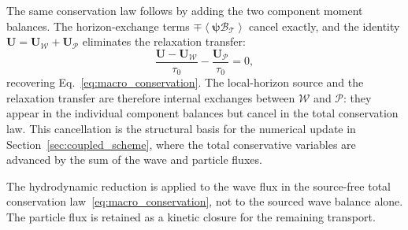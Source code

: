 \documentclass[preprint,12pt]{elsarticle}
\begin{document}
The same conservation law follows by adding the two component moment balances. The horizon-exchange terms $\mp\left\langle \boldsymbol{\psi}\mathcal B_\mathcal{T} \right\rangle$ cancel exactly, and the identity $\mathbf U=\mathbf U_{\mathcal{W}}+\mathbf U_{\mathcal{P}}$ eliminates the relaxation transfer:
\begin{equation}\label{eq:wp_moment_exchange}
    \frac{\mathbf U-\mathbf U_{\mathcal{W}}}{\tau_0}-\frac{\mathbf U_{\mathcal{P}}}{\tau_0}=0,
\end{equation}
recovering Eq.~\eqref{eq:macro_conservation}. The local-horizon source and the relaxation transfer are therefore internal exchanges between $\mathcal{W}$ and $\mathcal{P}$: they appear in the individual component balances but cancel in the total conservation law. This cancellation is the structural basis for the numerical update in Section~\ref{sec:coupled_scheme}, where the total conservative variables are advanced by the sum of the wave and particle fluxes.

The hydrodynamic reduction is applied to the wave flux in the source-free total conservation law~\eqref{eq:macro_conservation}, not to the sourced wave balance alone. The particle flux is retained as a kinetic closure for the remaining transport.
\end{document}
